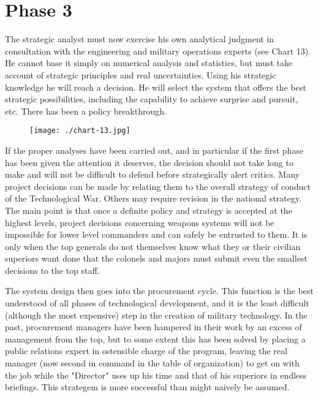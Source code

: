 \section{Phase 3}
The strategic analyst must now exercise his own analytical judgment in consultation with the engineering and military operations experts (see Chart 13). He cannot base it simply on numerical analysis and statistics, but must take account of strategic principles and real uncertainties. Using his strategic knowledge he will reach a decision. He will select the system that offers the best strategic possibilities, including the capability to achieve surprise and pursuit, etc. There has been a policy breakthrough.

\begin{figure}
    \texttt{[image: ./chart-13.jpg]}
    \label{fig:chart-13}
\end{figure}

If the proper analyses have been carried out, and in particular if the first phase has been given the attention it deserves, the decision should not take long to make and will not be difficult to defend before strategically alert critics. Many project decisions can be made by relating them to the overall strategy of conduct of the Technological War. Others may require revision in the national strategy. The main point is that once a definite policy and strategy is accepted at the highest levels, project decisions concerning weapons systems will not be impossible for lower level commanders and can safely be entrusted to them. It is only when the top generals do not themselves know what they or their civilian superiors want done that the colonels and majors must submit even the smallest decisions to the top staff.

The system design then goes into the procurement cycle. This function is the best understood of all phases of technological development, and it is the least difficult (although the most expensive) step in the creation of military technology. In the past, procurement managers have been hampered in their work by an excess of management from the top, but to some extent this has been solved by placing a public relations expert in ostensible charge of the program, leaving the real manager (now second in command in the table of organization) to get on with the job while the "Director" uses up his time and that of his superiors in endless briefings. This strategem is more successful than might naively be assumed.


